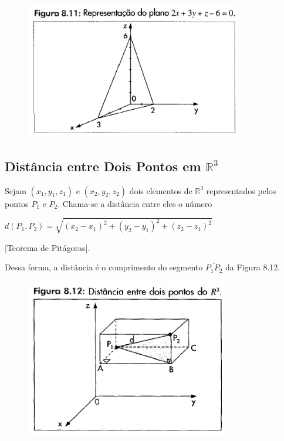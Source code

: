 		\begin{figure}[H]
			\includegraphics[height=6cm]{images/morettin_figura-8-11}
		\end{figure}

	\subsection{Distância entre Dois Pontos em $\mathbb{R}^{3}$ \cite{morettin}}

		Sejam $(x_{1}, y_{1}, z_{1})$ e $(x_{2}, y_{2}, z_{2})$ dois elementos de $\mathbb{R}^{3}$ representados pelos pontos $P_{1}$ e $P_{2}$. Chama-se a distância entre eles o número

		\bigskip

		{\LARGE $d(P_{1}, P_{2}) = \sqrt{(x_{2} - x_{1})^{2} + (y_{2} - y_{1})^{2} + (z_{2} - z_{1})^{2}}$}
		
		[Teorema de Pitágoras].

		\bigskip


		Dessa forma, a distância é o comprimento do segmento $\overline{P_{1}P_{2}}$ da Figura 8.12.

		\begin{figure}[H]
			\includegraphics[height=7cm]{images/morettin_figura-8-12}
		\end{figure}


